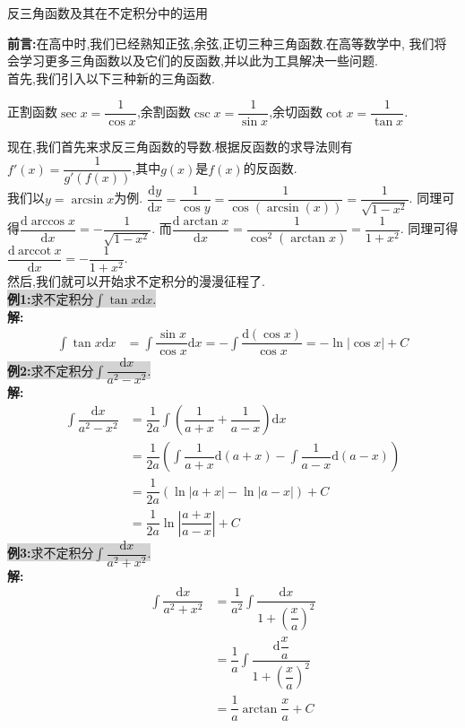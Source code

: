 \documentclass[a4paper,oneside]{ctexart}
\newcommand{\di}{\mathrm{d}}
\newcommand{\arccot}{\mathrm{ arccot}}
\begin{document}
\pagestyle{empty}
\begin{center}\large 反三角函数及其在不定积分中的运用\end{center}
\textbf{前言:}在高中时,我们已经熟知正弦,余弦,正切三种三角函数.在高等数学中,
我们将会学习更多三角函数以及它们的反函数,并以此为工具解决一些问题.\\
首先,我们引入以下三种新的三角函数.
\begin{center}
正割函数$\sec{x}=\dfrac{1}{\cos{x}}$,余割函数$\csc{x}=\dfrac{1}{\sin{x}}$,余切函数$\cot{x}=\dfrac{1}{\tan{x}}$.
\end{center}
现在,我们首先来求反三角函数的导数.根据反函数的求导法则有$f'(x)=\dfrac{1}{g'(f(x))}$,其中$g(x)$是$f(x)$的反函数.\\
我们以$y=\arcsin{x}$为例.
$\dfrac{\di y}{\di x}=\dfrac{1}{\cos{y}}=\dfrac{1}{\cos{(\arcsin(x))}}=\dfrac{1}{\sqrt{1-x^2}}$.
同理可得$\dfrac{\di \arccos{x}}{\di x}=-\dfrac{1}{\sqrt{1-x^2}}$.
而$\dfrac{\di \arctan{x}}{\di x}=\dfrac{1}{\cos^2{(\arctan{x})}}=\dfrac{1}{1+x^2}$.
同理可得$\dfrac{\di\ \arccot{\ x}}{\di x}=-\dfrac{1}{1+x^2}$.\\
然后,我们就可以开始求不定积分的漫漫征程了.\\
\colorbox{lightgray}{\textbf{例1:}求不定积分$\int{\tan{x}\di x}$.}\\
\textbf{解:}$$\begin{aligned}
  \int \tan{x}\di x &= \int \dfrac{\sin{x}}{\cos{x}}\di x
                     = -\int \dfrac{\di(\cos{x})}{\cos{x}}
                     = -\ln\left\lvert{\cos{x}}\right\rvert+C
\end{aligned}$$
\colorbox{lightgray}{\textbf{例2:}求不定积分$\int{\dfrac{\di x}{a^2-x^2}}$.}\\
\textbf{解:}
$$\begin{aligned}
  \int \dfrac{\di x}{a^2-x^2} &= \dfrac{1}{2a}\int\left(\dfrac{1}{a+x}+\dfrac{1}{a-x}\right)\di x\\
                              &= \dfrac{1}{2a}\left(\int\dfrac{1}{a+x}\di(a+x)-\int\dfrac{1}{a-x}\di(a-x)\right)\\
                              &= \dfrac{1}{2a}\left(\ln\left\lvert a+x\right\rvert-\ln\left\lvert a-x\right\rvert\right)+C\\
                              &= \dfrac{1}{2a}\ln{\left\lvert\dfrac{a+x}{a-x}\right\rvert}+C
\end{aligned}$$
\colorbox{lightgray}{\textbf{例3:}求不定积分$\int{\dfrac{\di x}{a^2+x^2}}$.}\\
\textbf{解:}
$$\begin{aligned}
  \int \dfrac{\di x}{a^2+x^2} &= \dfrac{1}{a^2}\int\dfrac{\di x}{1+\left(\dfrac{x}{a}\right)^2}\\
                              &= \dfrac{1}{a}\int\dfrac{\di\dfrac{x}{a}}{1+\left(\dfrac{x}{a}\right)^2}\\
                              &= \dfrac{1}{a}\arctan{\dfrac{x}{a}}+C
\end{aligned}$$
\end{document}
